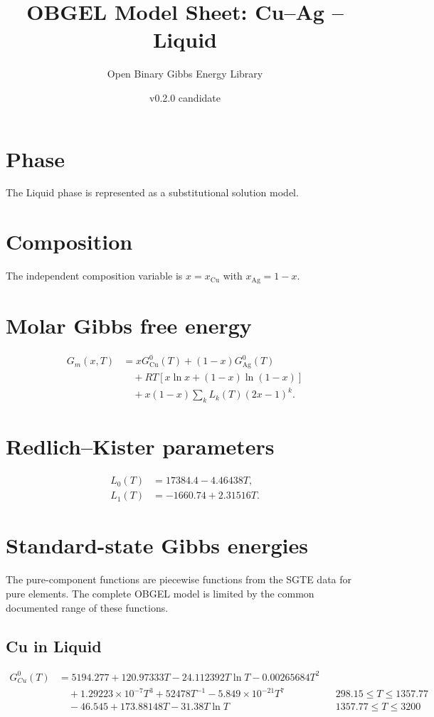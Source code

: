 \documentclass[11pt]{article}
\title{OBGEL Model Sheet: Cu--Ag -- Liquid}
\author{Open Binary Gibbs Energy Library}
\date{v0.2.0 candidate}
\begin{document}
\maketitle
\section*{Phase}
The Liquid phase is represented as a substitutional solution model.

\section*{Composition}
The independent composition variable is $x=x_{\mathrm{Cu}}$ with $x_{\mathrm{Ag}}=1-x$.

\section*{Molar Gibbs free energy}
\begin{align*}
G_m(x,T) &= xG^0_{\mathrm{Cu}}(T)+(1-x)G^0_{\mathrm{Ag}}(T)\\
&\quad+RT\left[x\ln x+(1-x)\ln(1-x)\right]\\
&\quad+x(1-x)\sum_k L_k(T)(2x-1)^k.
\end{align*}

\section*{Redlich--Kister parameters}
\begin{align*}
L_0(T)&=17384.4 - 4.46438T,\\
L_1(T)&=-1660.74 + 2.31516T.
\end{align*}

\section*{Standard-state Gibbs energies}
The pure-component functions are piecewise functions from the SGTE data for pure elements. The complete OBGEL model is limited by the common documented range of these functions.

\subsection*{Cu in Liquid}
\begin{align*}
G^0_{Cu}(T) &= 5194.277 + 120.97333T - 24.112392T\ln T - 0.00265684T^{2}\\[4pt]
&\quad+ 1.29223\times 10^{-7}T^{3} + 52478T^{-1} - 5.849\times 10^{-21}T^{7} && 298.15 \le T \le 1357.77\\[4pt]
&\quad - 46.545 + 173.88148T - 31.38T\ln T && 1357.77 \le T \le 3200
\end{align*}
\end{document}
